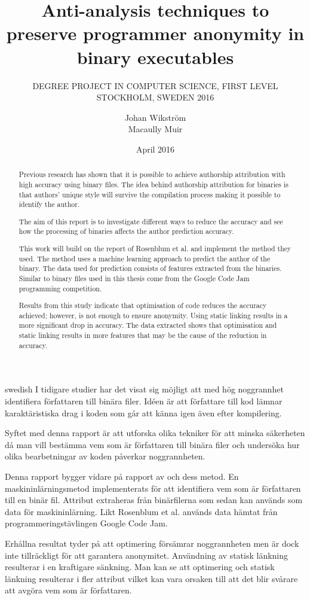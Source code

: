 \documentclass[a4paper,11pt]{kth-mag}
\title{Anti-analysis techniques to preserve programmer anonymity in binary
executables}
\subtitle{
    DEGREE PROJECT IN COMPUTER SCIENCE, FIRST LEVEL \\
    STOCKHOLM, SWEDEN 2016
}
\author{Johan Wikström \\ Macaully Muir}
\date{April 2016}
\begin{document}
\frontmatter
\pagestyle{empty}
\removepagenumbers
\maketitle
{}
\begin{abstract}
Previous research has shown that it is possible to achieve authorship
attribution with high accuracy using binary files. The idea behind authorship
attribution for binaries is that authors’ unique style will survive the
compilation process making it possible to identify the author.    

The aim of this report is to investigate different ways to reduce the accuracy
and see how the processing of binaries affects the author prediction accuracy.

This work will build on the report of Rosenblum et al. and implement the method
they used. The method uses a machine learning approach to predict the author
of the binary. The data used for prediction consists of features extracted from
the binaries. Similar to \parencite{rosenblum2011wrote} binary files used in this
thesis come from the Google Code Jam programming competition.

Results from this study indicate that optimisation of code reduces the accuracy
achieved; however, is not enough to ensure anonymity. Using static linking
results in a more significant drop in accuracy. The data extracted shows that
optimisation and static linking results in more features that may be the cause
of the reduction in accuracy.
\end{abstract}
\clearpage
\begin{foreignabstract}{swedish}
I tidigare studier har det visat sig möjligt att med hög noggrannhet
identifiera författaren till binära filer. Idéen är att författare till kod
lämnar karaktäristiska drag i koden som går att känna igen även efter
kompilering. 

Syftet med denna rapport är att utforska olika tekniker för att minska
säkerheten då man vill bestämma vem som är författaren till binära filer och
undersöka hur olika bearbetningar av koden påverkar noggrannheten.     

Denna rapport bygger vidare på rapport av \parencite{rosenblum2011wrote}
och dess metod. En maskininlärningsmetod implementerats för
att identifiera vem som är författaren till en binär fil. Attribut extraheras
från binärfilerna som sedan kan används som data för maskininlärning. Likt
Rosenblum et al. används data hämtat från programmeringstävlingen Google Code
Jam. 

Erhållna resultat tyder på att optimering försämrar noggrannheten men är dock
inte tillräckligt för att garantera anonymitet. Användning av statisk länkning
resulterar i en kraftigare sänkning. Man kan se att optimering och statisk
länkning resulterar i fler attribut vilket kan vara orsaken till att det blir
svårare att avgöra vem som är författaren.
\end{foreignabstract}
\clearpage
\tableofcontents*
\mainmatter
\pagestyle{newchap}
\end{document}
